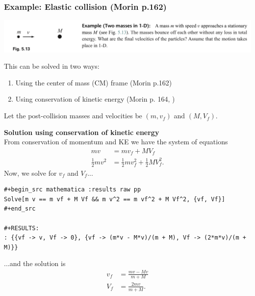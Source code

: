  




\subsubsection*{Example: Elastic collision (Morin p.162)}

\begin{mdframed}
  \includegraphics[width=400pt]{img/physics--classical-mechanics--morin--sec-5-6-ex.png}
\end{mdframed}

This can be solved in two ways:
\begin{enumerate}
\item Using the center of mass (CM) frame (Morin p.162)
\item Using conservation of kinetic energy (Morin p. 164, )
\end{enumerate}

Let the post-collision masses and velocities be $(m, v_f)$ and $(M, V_f)$.

{\bf Solution using conservation of kinetic energy}\\

From conservation of momentum and KE we have the system of equations
\begin{align}
  mv              &= mv_f + MV_f \\
  \frac{1}{2}mv^2 &= \frac{1}{2}mv_f^2 + \frac{1}{2}MV_f^2.
\end{align}
Now, we solve for $v_f$ and $V_f$...

\begin{verbatim}
#+begin_src mathematica :results raw pp
Solve[m v == m vf + M Vf && m v^2 == m vf^2 + M Vf^2, {vf, Vf}]
#+end_src

#+RESULTS:
: {{vf -> v, Vf -> 0}, {vf -> (m*v - M*v)/(m + M), Vf -> (2*m*v)/(m + M)}}
\end{verbatim}
...and the solution is
\begin{align*}
  v_f &= \frac{mv - Mv}{m + M} \\
  V_f &= \frac{2mv}{m + M}.
\end{align*}

